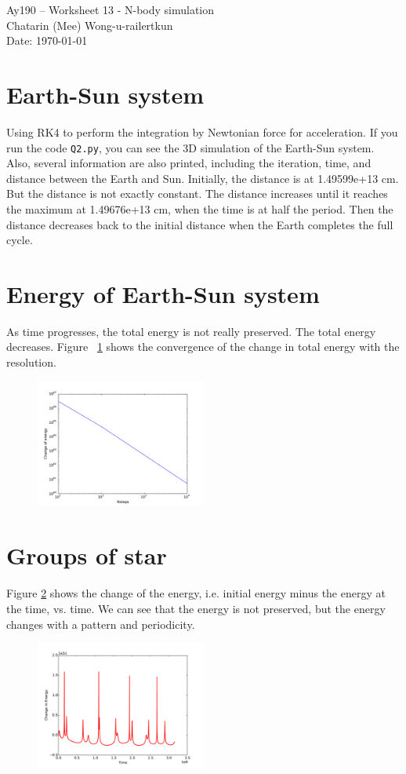 \documentclass[11pt,letterpaper]{article}
\begin{document}
\begin{center}
\Large
Ay190 -- Worksheet 13 - N-body simulation \\    %
Chatarin (Mee) Wong-u-railertkun\\
Date: \today
\end{center}

\section{Earth-Sun system}

Using RK4 to perform the integration by Newtonian force for acceleration. If you run the code \texttt{Q2.py}, you can see the 3D simulation of the Earth-Sun system. Also, several information are also printed, including the iteration, time, and distance between the Earth and Sun. Initially, the distance is at 1.49599e+13 cm. But the distance is not exactly constant. The distance increases until it reaches the maximum at 1.49676e+13 cm, when the time is at half the period. Then the distance decreases back to the initial distance when the Earth completes the full cycle.

\section{Energy of Earth-Sun system}

As time progresses, the total energy is not really preserved. The total energy decreases. Figure ~\ref{fig:Energy_Cov} shows the convergence of the change in total energy with the resolution.

\begin{figure}[h!]
	\centering
	\includegraphics[width=0.5\textwidth]{Energy_Conv}
	\caption{}
	\label{fig:Energy_Cov}
\end{figure}

\section{Groups of star}
Figure \ref{fig:DeltaE} shows the change of the energy, i.e. initial energy minus the energy at the time, vs. time. We can see that the energy is not preserved, but the energy changes with a pattern and periodicity.


\begin{figure}[h!]
	\centering
	\includegraphics[width=0.5\textwidth]{DeltaE}
	\caption{}
	\label{fig:DeltaE}
\end{figure}
	
\end{document}
